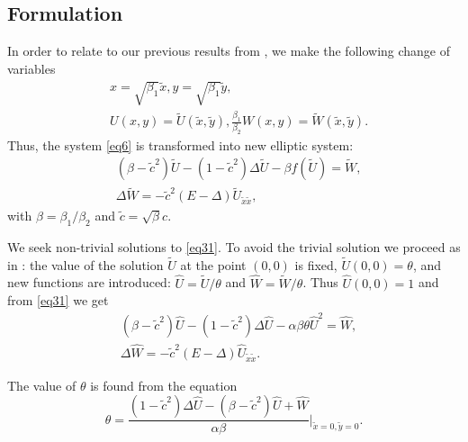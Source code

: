 \documentclass[12pt]{article}
\theoremstyle{theorem}
\theoremstyle{defi}
\begin{document}
\subsection{Formulation}


In order to relate to our previous results from \cite{ref14, ref15}, we make the following change of variables
\begin{equation}\label{eqVCN}
\begin{split}
&x=\sqrt{\beta_1} { \tilde{x} }, y=\sqrt{\beta_1} { \tilde{ y} },\\
&U(x,y)= \tilde U({ \tilde{x} },{ \tilde{y} } ), \frac{\beta_1}{\beta_2} W(x,y)=  \tilde W({ \tilde{x} },{ \tilde{y} } ).
\end{split}
\end{equation}
Thus, the system \eqref{eq6} is transformed into new elliptic system:
\begin{equation}\label{eq31}
\begin{split}
&(\beta-\tilde c ^2) \tilde U  -(1- \tilde c^2) \Delta \tilde U - \beta f( \tilde U ) = \tilde W, \\
&\Delta \tilde W =  - \tilde c^2 (E- \Delta) \tilde U_{\tilde x \tilde x},
\end{split}
\end{equation}
with $\beta = \beta_1 / \beta_2$ and $ \tilde c = \sqrt {\beta} c$.

We seek  non-trivial solutions to \eqref{eq31}. To avoid the trivial solution we proceed as in \cite{ref6}: the value of the solution $\tilde U$ at the point $(0,0)$ is fixed,  $\tilde U(0,0)=\theta $, and new  functions are introduced: $\widehat{U}=\tilde U /{\theta} $ and $\widehat{W}=\tilde W /{\theta} $. Thus
$ \widehat{U}(0,0)=1$ and from \eqref{eq31} we get
\begin{equation}\label{eq32}
\begin{split}
& (\beta-\tilde c^2) \widehat{U}  -(1-\tilde c^2) \Delta \widehat{U} - \alpha \beta \theta \widehat{U}^2 = \widehat{W}, \\
&\Delta \widehat{W} = - \tilde c^2 (E- \Delta) \widehat{U}_{\tilde x \tilde x}.
\end{split}
\end{equation}

The value of $\theta $ is found from the  equation
\begin{equation}\label{eqtheta}
\theta = \frac{ (1-\tilde c^2 )\Delta \widehat{U} - (\beta-\tilde c^2) \widehat{U} +\widehat{W}}{\alpha \beta} |_{\tilde x=0,\tilde y=0} .
\end{equation}
\end{document}

